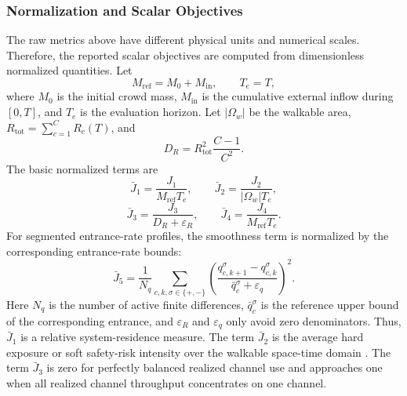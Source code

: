 \documentclass[lettersize,journal]{IEEEtran}
\begin{document}
\subsubsection{Normalization and Scalar Objectives}

The raw metrics above have different physical units and numerical scales.
Therefore, the reported scalar objectives are computed from dimensionless normalized quantities.
Let
\[
M_{\mathrm{ref}}=M_0+M_{\mathrm{in}},\qquad T_e=T,
\]
where $M_0$ is the initial crowd mass, $M_{\mathrm{in}}$ is the cumulative external inflow during $[0,T]$, and $T_e$ is the evaluation horizon.
Let $|\Omega_w|$ be the walkable area, $R_{\mathrm{tot}}=\sum_{c=1}^{C}R_c(T)$, and
\[
D_R=R_{\mathrm{tot}}^2\frac{C-1}{C^2}.
\]
The basic normalized terms are
\[
\bar J_1=\frac{J_1}{M_{\mathrm{ref}}T_e},\qquad
\bar J_2=\frac{J_2}{|\Omega_w|T_e},
\]
\[
\bar J_3=\frac{J_3}{D_R+\varepsilon_R},\qquad
\bar J_4=\frac{J_4}{M_{\mathrm{ref}}T_e}.
\]
For segmented entrance-rate profiles, the smoothness term is normalized by the corresponding entrance-rate bounds:
\[
\bar J_5=
\frac{1}{N_q}
\sum_{c,k,\sigma\in\{+,-\}}
\left(
\frac{q_{c,k+1}^{\sigma}-q_{c,k}^{\sigma}}
{\bar q_c^{\sigma}+\varepsilon_q}
\right)^2 .
\]
Here $N_q$ is the number of active finite differences, $\bar q_c^\sigma$ is the reference upper bound of the corresponding entrance, and $\varepsilon_R$ and $\varepsilon_q$ only avoid zero denominators.
Thus, $\bar J_1$ is a relative system-residence measure.
The term $\bar J_2$ is the average hard exposure or soft safety-risk intensity over the walkable space-time domain \cite{RN2059}.
The term $\bar J_3$ is zero for perfectly balanced realized channel use and approaches one when all realized channel throughput concentrates on one channel.
\end{document}
